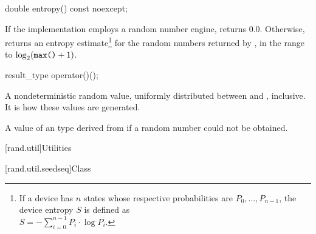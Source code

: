 %
\begin{itemdecl}
double entropy() const noexcept;
\end{itemdecl}

\begin{itemdescr}
\pnum\returns If the implementation employs a random number engine,
 returns $0.0$.
 Otherwise, returns an entropy estimate\footnote{If a device has $n$ states
   whose respective probabilities are
   $P_0, \dotsc, P_{n-1}$,
   the device entropy $S$ is defined as\\
   $S = - \sum_{i=0}^{n-1} P_i \cdot \log P_i$.}
 for the random numbers returned by ,
 in the range
 to
   $\log_2( \texttt{max()}+1)$.
\end{itemdescr}

%
\begin{itemdecl}
result_type operator()();
\end{itemdecl}

\begin{itemdescr}
\pnum\returns A nondeterministic random value,
 uniformly distributed
 between  and ,
 inclusive.
 It is 
 how these values are generated.

\pnum
\throws A value of an 
 type derived from 
 if a random number could not be obtained.
\end{itemdescr}




[rand.util]{Utilities}%
%


[rand.util.seedseq]{Class }%

